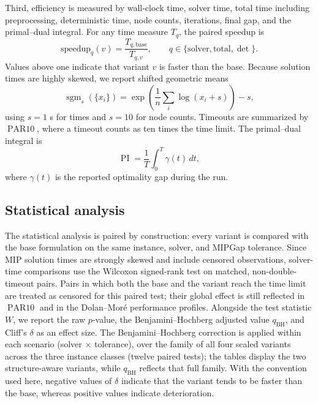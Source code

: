 \documentclass[AMA,Times1COL]{WileyNJDv5} %
\newcommand{\sgm}{\ensuremath{\operatorname{sgm}}}
\newcommand{\PARten}{\ensuremath{\operatorname{PAR10}}}
\newcommand{\PI}{\ensuremath{\operatorname{PI}}}
\providecommand{\DIFadd}[1]{{\protect\color{blue} \sf #1}} %
\providecommand{\DIFaddbegin}{} %
\providecommand{\DIFaddend}{} %
\begin{document}
Third, efficiency is measured by wall-clock time, solver time, total time including
preprocessing, deterministic time, node counts, iterations, final gap, and the
primal--dual integral. For any time measure $T_q$, the paired speedup is
\begin{equation}
\mathrm{speedup}_{q}(v)=
\frac{T_{q,\mathrm{base}}}{T_{q,v}},
\qquad
q\in\{\mathrm{solver},\mathrm{total},\det\}.
\label{eq:speedup}
\end{equation}
Values above one indicate that variant $v$ is faster than the base. Because solution
times are highly skewed, we report shifted geometric means
\begin{equation}
\sgm_s(\{x_i\})=
\exp\!\left(\frac{1}{n}\sum_i \log(x_i+s)\right)-s,
\label{eq:shifted-geometric-mean}
\end{equation}
using $s=1$ s for times and $s=10$ for node counts. Timeouts are summarized by
\PARten{}, where a timeout counts as ten times the time limit. The primal--dual integral
is
\begin{equation}
\PI=\frac{1}{T}\int_0^T \gamma(t)\,dt,
\label{eq:primal-dual-integral}
\end{equation}
where $\gamma(t)$ is the reported optimality gap during the run.

\subsection{Statistical analysis}

The statistical analysis is paired by construction: every variant is compared with the
base formulation on the same instance, solver, and MIPGap tolerance. Since MIP solution
times are strongly skewed and include censored observations, solver-time comparisons
use the Wilcoxon signed-rank test on matched, non-double-timeout pairs. Pairs in which
both the base and the variant reach the time limit are treated as censored for this
paired test; their global effect is still reflected in \PARten{} and in the Dolan--Mor\'e
performance profiles. Alongside the test statistic $W$, we report the raw $p$-value, the
Benjamini--Hochberg adjusted value $q_{\mathrm{BH}}$, and Cliff's $\delta$ as an effect
size. \DIFaddbegin \DIFadd{The Benjamini--Hochberg correction is applied within each scenario (solver $\times$
tolerance), over the family of all four scaled variants across the three instance classes
(twelve paired tests); the tables display the two structure-aware variants, while
$q_{\mathrm{BH}}$ reflects that full family. }\DIFaddend With the convention used here, negative values of $\delta$ indicate that the
variant tends to be faster than the base, whereas positive values indicate deterioration.
\end{document}
